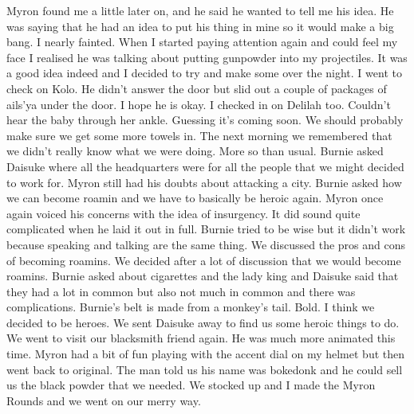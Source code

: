 Myron found me a little later on, and he said he wanted to tell me his idea. He was saying that he had an idea to put his thing in mine so it would make a big bang. I nearly fainted. When I started paying attention again and could feel my face I realised he was talking about putting gunpowder into my projectiles. It was a good idea indeed and I decided to try and make some over the night. I went to check on Kolo. He didn’t answer the door but slid out a couple of packages of ails’ya under the door. I hope he is okay. I checked in on Delilah too. Couldn’t hear the baby through her ankle. Guessing it’s coming soon. We should probably make sure we get some more towels in. The next morning we remembered that we didn’t really know what we were doing. More so than usual. Burnie asked Daisuke where all the headquarters were for all the people that we might decided to work for. Myron still had his doubts about attacking a city. Burnie asked how we can become roamin and we have to basically be heroic again. Myron once again voiced his concerns with the idea of insurgency. It did sound quite complicated when he laid it out in full. Burnie tried to be wise but it didn’t work because speaking and talking are the same thing. We discussed the pros and cons of becoming roamins. We decided after a lot of discussion that we would become roamins. Burnie asked about cigarettes and the lady king and Daisuke said that they had a lot in common but also not much in common and there was complications. Burnie’s belt is made from a monkey’s tail. Bold. I think we decided to be heroes. We sent Daisuke away to find us some heroic things to do. We went to visit our blacksmith friend again. He was much more animated this time. Myron had a bit of fun playing with the accent dial on my helmet but then went back to original. The man told us his name was bokedonk and he could sell us the black powder that we needed. We stocked up and I made the Myron Rounds and we went on our merry way.\medskip
